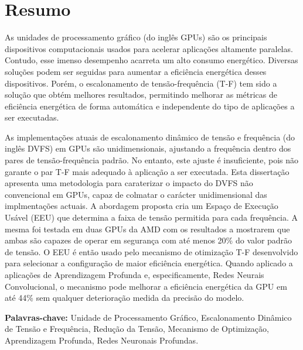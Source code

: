 
\section*{Resumo}


As unidades de processamento gráfico (do inglês GPUs) são os principais dispositivos computacionais usados para acelerar aplicações altamente paralelas. Contudo, esse imenso desempenho acarreta um alto consumo energético. Diversas soluções podem ser seguidas para aumentar a eficiência energética desses dispositivos. Porém, o escalonamento de tensão-frequência (T-F) tem sido a solução que obtém melhores resultados, permitindo melhorar as métricas de eficiência energética de forma automática e independente do tipo de aplicações a ser executadas. 

As implementações atuais de escalonamento dinâmico de tensão e frequência (do inglês DVFS) em GPUs são unidimensionais, ajustando a frequência dentro dos pares de tensão-frequência padrão. No entanto, este ajuste é insuficiente, pois não garante o par T-F mais adequado à aplicação a ser executada. Esta dissertação apresenta uma metodologia para caraterizar o impacto do DVFS não convencional em GPUs, capaz de colmatar o carácter unidimensional das implmentações actuais. A abordagem proposta cria um Espaço de Execução Usável (EEU) que determina a faixa de tensão permitida para cada frequência. A mesma foi testada em duas GPUs da AMD com os resultados a mostrarem que ambas são capazes de operar em segurança com até menos 20\% do valor padrão de tensão.
O EEU é então usado pelo mecanismo de otimização T-F desenvolvido para selecionar a configuração de maior eficiência energética. Quando aplicado a aplicações de Aprendizagem Profunda e, especificamente, Redes Neurais Convolucional, o mecanismo pode melhorar a eficiência energética da GPU em até 44\% sem qualquer deterioração medida da precisão do modelo.

\vfill

\textbf{\Large Palavras-chave:} Unidade de Processamento Gráfico, Escalonamento Dinâmico de Tensão e Frequência, Redução da Tensão, Mecanismo de Optimização, Aprendizagem Profunda, Redes Neuronais Profundas.
